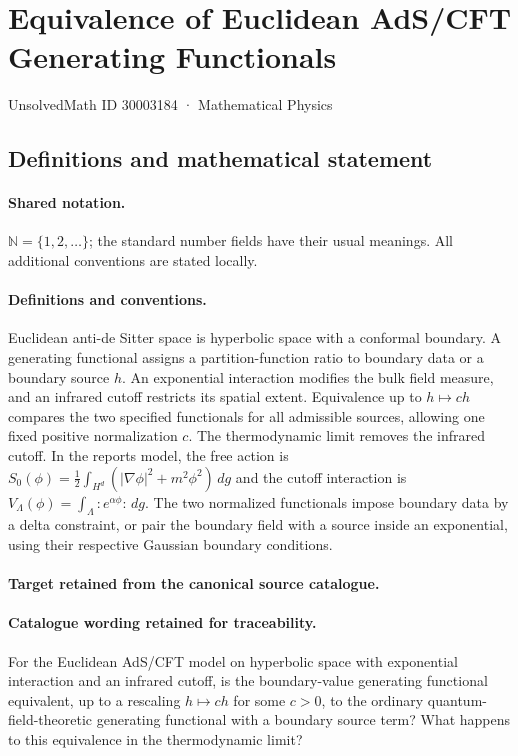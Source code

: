 \documentclass[11pt]{article}
\begin{document}
\setcounter{section}{30003183}
\section{Equivalence of Euclidean AdS/CFT Generating Functionals}\label{30003184}
{\small UnsolvedMath ID 30003184 · Mathematical Physics}
\subsection{Definitions and mathematical statement}

\paragraph{Shared notation.}$\mathbb N=\{1,2,\ldots\}$; the standard number fields have their usual meanings. All additional conventions are stated locally.


\paragraph{Definitions and conventions.}
Euclidean anti-de Sitter space is hyperbolic space with a conformal boundary. A generating functional assigns a partition-function ratio to boundary data or a boundary source $h$. An exponential interaction modifies the bulk field measure, and an infrared cutoff restricts its spatial extent. Equivalence up to $h\mapsto ch$ compares the two specified functionals for all admissible sources, allowing one fixed positive normalization $c$. The thermodynamic limit removes the infrared cutoff. In the report\textquotesingle s model, the free action is $S_0(\phi)=\frac12\int_{H^d}(|\nabla\phi|^2+m^2\phi^2)\,dg$ and the cutoff interaction is $V_\Lambda(\phi)=\int_\Lambda:\!e^{\alpha\phi}\!:\,dg$. The two normalized functionals impose boundary data by a delta constraint, or pair the boundary field with a source inside an exponential, using their respective Gaussian boundary conditions.

\paragraph{Target retained from the canonical source catalogue.}
\paragraph{Catalogue wording retained for traceability.}
For the Euclidean AdS/CFT model on hyperbolic space with exponential interaction and an infrared cutoff, is the boundary-value generating functional equivalent, up to a rescaling $h\mapsto ch$ for some $c>0$, to the ordinary quantum-field-theoretic generating functional with a boundary source term? What happens to this equivalence in the thermodynamic limit?
\end{document}
